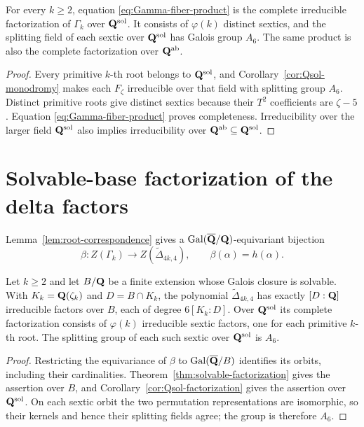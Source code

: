 \begin{corollary}
\label{cor:Qsol-factorization}
For every $k\ge2$, equation \eqref{eq:Gamma-fiber-product} is the
complete irreducible factorization of $\Gamma_k$ over
$\mathbf Q^{\mathrm{sol}}$.  It consists of $\varphi(k)$ distinct sextics,
and the splitting field of each sextic over $\mathbf Q^{\mathrm{sol}}$ has
Galois group $A_6$.  The same product is also the complete
factorization over $\mathbf Q^{\mathrm{ab}}$.
\end{corollary}

\begin{proof}
Every primitive $k$-th root belongs to $\mathbf Q^{\mathrm{sol}}$, and
Corollary~\ref{cor:Qsol-monodromy} makes each $F_\zeta$ irreducible
over that field with splitting group $A_6$.  Distinct primitive roots
give distinct sextics because their $T^2$ coefficients are
$\zeta-5$.  Equation \eqref{eq:Gamma-fiber-product} proves
completeness.  Irreducibility over the larger field
$\mathbf Q^{\mathrm{sol}}$ also implies irreducibility over
$\mathbf Q^{\mathrm{ab}}\subseteq\mathbf Q^{\mathrm{sol}}$.
\end{proof}

\section{Solvable-base factorization of the delta factors}

Lemma~\ref{lem:root-correspondence} gives a
$\operatorname{Gal}(\overline{\mathbf Q}/\mathbf Q)$-equivariant bijection
\[
 \beta:Z(\Gamma_k)\longrightarrow
 Z(\widetilde\Delta_{4k,4}),
 \qquad \beta(\alpha)=h(\alpha).
\]

\begin{theorem}
\label{thm:delta-solvable-factorization}
Let $k\ge2$ and let $B/\mathbf Q$ be a finite extension whose Galois closure
is solvable.  With $K_k=\mathbf Q(\zeta_k)$ and $D=B\cap K_k$, the polynomial
$\widetilde\Delta_{4k,4}$ has exactly $[D:\mathbf Q]$ irreducible factors
over $B$, each of degree $6[K_k:D]$.  Over $\mathbf Q^{\mathrm{sol}}$ its
complete factorization consists of $\varphi(k)$ irreducible sextic
factors, one for each primitive $k$-th root.  The splitting group of
each such sextic over $\mathbf Q^{\mathrm{sol}}$ is $A_6$.
\end{theorem}

\begin{proof}
Restricting the equivariance of $\beta$ to
$\operatorname{Gal}(\overline{\mathbf Q}/B)$ identifies its orbits, including their
cardinalities.  Theorem~\ref{thm:solvable-factorization} gives the
assertion over $B$, and Corollary~\ref{cor:Qsol-factorization} gives
the assertion over $\mathbf Q^{\mathrm{sol}}$.  On each sextic orbit the
two permutation representations are isomorphic, so their kernels and
hence their splitting fields agree; the group is therefore $A_6$.
\end{proof}


